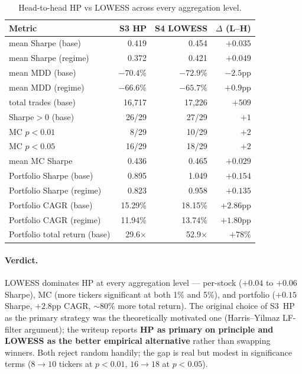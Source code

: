 \documentclass[11pt,a4paper]{article}
\begin{document}
\begin{table}[h]
\centering
\begin{tabular}{@{}lrrr@{}}
\toprule
\textbf{Metric}                  & \textbf{S3 HP} & \textbf{S4 LOWESS} & \textbf{$\Delta$ (L--H)} \\
\midrule
mean Sharpe (base)               & 0.419 & 0.454 & $+0.035$ \\
mean Sharpe (regime)             & 0.372 & 0.421 & $+0.049$ \\
mean MDD (base)                  & $-70.4\%$ & $-72.9\%$ & $-2.5$pp \\
mean MDD (regime)                & $-66.6\%$ & $-65.7\%$ & $+0.9$pp \\
total trades (base)              & 16{,}717 & 17{,}226 & $+509$ \\
Sharpe$>$0 (base)                & 26/29 & 27/29 & $+1$ \\
\midrule
MC $p<0.01$                      & 8/29  & 10/29 & $+2$ \\
MC $p<0.05$                      & 16/29 & 18/29 & $+2$ \\
mean MC Sharpe                   & 0.436 & 0.465 & $+0.029$ \\
\midrule
Portfolio Sharpe (base)          & 0.895 & 1.049 & $+0.154$ \\
Portfolio Sharpe (regime)        & 0.823 & 0.958 & $+0.135$ \\
Portfolio CAGR (base)            & 15.29\% & 18.15\% & $+2.86$pp \\
Portfolio CAGR (regime)          & 11.94\% & 13.74\% & $+1.80$pp \\
Portfolio total return (base)    & 29.6$\times$ & 52.9$\times$ & $+78\%$ \\
\bottomrule
\end{tabular}
\caption{Head-to-head HP vs LOWESS across every aggregation level.}
\end{table}

\paragraph{Verdict.} LOWESS dominates HP at every aggregation level ---
per-stock ($+0.04$ to $+0.06$ Sharpe), MC (more tickers significant at
both 1\% and 5\%), and portfolio ($+0.15$ Sharpe, $+2.8$pp CAGR,
$\sim$80\% more total return). The original choice of S3~HP as the primary
strategy was the theoretically motivated one (Harris--Yilmaz LF-filter
argument); the writeup reports \textbf{HP as primary on principle and LOWESS
as the better empirical alternative} rather than swapping winners. Both reject
random handily; the gap is real but modest in significance terms
($8 \to 10$ tickers at $p<0.01$, $16 \to 18$ at $p<0.05$).
\end{document}
